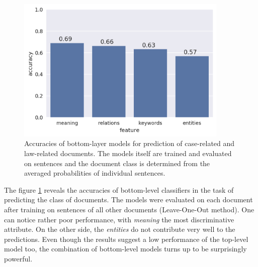\documentclass[
  digital, %
  notable,   %
  nolof,     %
  nolot,     %
]{fithesis3}
\begin{document}
\begin{figure}[h]
\caption{Accuracies of bottom-layer models for prediction of case-related and law-related documents. The models itself are trained and evaluated on sentences and the document class is determined from the averaged probabilities of individual sentences. }
\label{fig:Case-Law_accuracies}
\includegraphics[width=0.9\textwidth]{img/Case-Law_accuracies}
\end{figure}

The figure \ref{fig:Case-Law_accuracies} reveals the accuracies of bottom-level classifiers in the task of predicting the class of documents.
The models were evaluated on each document after training on sentences of all other documents (Leave-One-Out method).
One can notice rather poor performance, with \textit{meaning} the most discriminative attribute.
On the other side, the \textit{entities} do not contribute very well to the predictions.
Even though the results suggest a low performance of the top-level model too, the combination of bottom-level models turns up to be surprisingly powerful.
\end{document}
